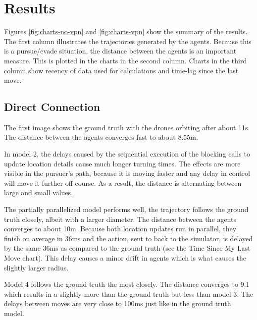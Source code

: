 \documentclass{article}
\begin{document}

\section{Results}
Figures \ref{fig:charts-no-vpn} and \ref{fig:charts-vpn} show the summary of the results.  The first column illustrates the trajectories generated by the agents. Because this is a pursue/evade situation, the distance between the agents is an important measure. This is plotted in the charts in the second column.
Charts in the third column show recency of data used for calculations and time-lag since the last move.

\subsection{Direct Connection}
The first image shows the ground truth with the drones orbiting after about 11s. The distance between the agents converges fast to about 8.55m.

In model 2, the delays caused by the sequential execution of the blocking calls to update location details cause much longer turning times. The effects are more visible in the pursuer's path, because it is moving faster and any delay in control will move it further off course. As a result, the distance is alternating between large and small values.

The partially parallelized model performs well, the trajectory follows the ground truth closely, albeit with a larger diameter. The distance between the agents converges to about 10m. Because both location updates run in parallel, they finish on average in 36ms and the action, sent to back to the simulator, is delayed by the same 36ms as compared to the ground truth (see the Time Since My Last Move chart). This delay causes a minor drift in agents which is what causes the slightly larger radius.

Model 4 follows the ground truth the most closely. The distance converges to 9.1 which results in a slightly more than the ground truth but less than model 3. The delays between moves are very close to 100ms just like in the ground truth model.
\end{document}
